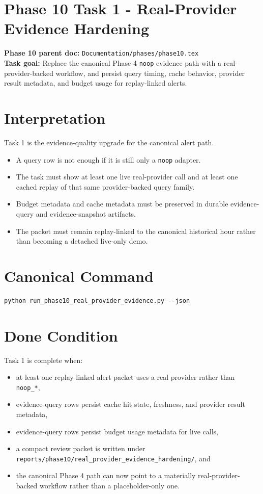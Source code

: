 \documentclass{article}
\begin{document}
\section*{Phase 10 Task 1 - Real-Provider Evidence Hardening}

\textbf{Phase 10 parent doc:} \texttt{Documentation/phases/phase10.tex}\\
\textbf{Task goal:} Replace the canonical Phase 4 \texttt{noop} evidence path with a real-provider-backed workflow, and persist query timing, cache behavior, provider result metadata, and budget usage for replay-linked alerts.

\section*{Interpretation}
Task 1 is the evidence-quality upgrade for the canonical alert path.
\begin{itemize}
\item A query row is not enough if it is still only a \texttt{noop} adapter.
\item The task must show at least one live real-provider call and at least one cached replay of that same provider-backed query family.
\item Budget metadata and cache metadata must be preserved in durable evidence-query and evidence-snapshot artifacts.
\item The packet must remain replay-linked to the canonical historical hour rather than becoming a detached live-only demo.
\end{itemize}

\section*{Canonical Command}
\begin{verbatim}
python run_phase10_real_provider_evidence.py --json
\end{verbatim}

\section*{Done Condition}
Task 1 is complete when:
\begin{itemize}
\item at least one replay-linked alert packet uses a real provider rather than \texttt{noop\_*},
\item evidence-query rows persist cache hit state, freshness, and provider result metadata,
\item evidence-query rows persist budget usage metadata for live calls,
\item a compact review packet is written under \texttt{reports/phase10/real\_provider\_evidence\_hardening/}, and
\item the canonical Phase 4 path can now point to a materially real-provider-backed workflow rather than a placeholder-only one.
\end{itemize}
\end{document}
